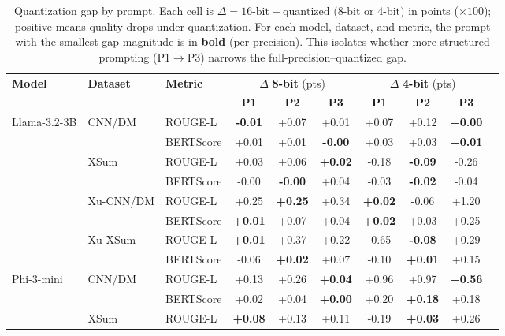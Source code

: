 \begin{table}[!tp]
\centering
\footnotesize
\setlength{\tabcolsep}{5pt}
\caption{Quantization gap by prompt. Each cell is $\Delta = \text{16-bit} - \text{quantized (8-bit or 4-bit)}$ in points ($\times 100$); positive means quality drops under quantization. For each model, dataset, and metric, the prompt with the smallest gap magnitude is in \textbf{bold} (per precision). This isolates whether more structured prompting (P1$\to$P3) narrows the full-precision--quantized gap.}
\label{tab:rq-gap}
\begin{tabular}{lllccccccc}
\toprule
\multirow{2}{*}{\textbf{Model}} & \multirow{2}{*}{\textbf{Dataset}} & \multirow{2}{*}{\textbf{Metric}} & \multicolumn{3}{c}{$\Delta$ \textbf{8-bit} (pts)} & \multicolumn{3}{c}{$\Delta$ \textbf{4-bit} (pts)} \\
\cmidrule(lr){4-6}\cmidrule(lr){7-9}
 & & & \textbf{P1} & \textbf{P2} & \textbf{P3} & \textbf{P1} & \textbf{P2} & \textbf{P3} \\
\midrule
\multirow{8}{*}{Llama-3.2-3B} & \multirow{2}{*}{CNN/DM} & ROUGE-L & \textbf{-0.01} & +0.07 & +0.01 & +0.07 & +0.12 & \textbf{+0.00} \\
 &  & BERTScore & +0.01 & +0.01 & \textbf{-0.00} & +0.03 & +0.03 & \textbf{+0.01} \\
\cmidrule(lr){2-9}
 & \multirow{2}{*}{XSum} & ROUGE-L & +0.03 & +0.06 & \textbf{+0.02} & -0.18 & \textbf{-0.09} & -0.26 \\
 &  & BERTScore & -0.00 & \textbf{-0.00} & +0.04 & -0.03 & \textbf{-0.02} & -0.04 \\
\cmidrule(lr){2-9}
 & \multirow{2}{*}{Xu-CNN/DM} & ROUGE-L & +0.25 & \textbf{+0.25} & +0.34 & \textbf{+0.02} & -0.06 & +1.20 \\
 &  & BERTScore & \textbf{+0.01} & +0.07 & +0.04 & \textbf{+0.02} & +0.03 & +0.25 \\
\cmidrule(lr){2-9}
 & \multirow{2}{*}{Xu-XSum} & ROUGE-L & \textbf{+0.01} & +0.37 & +0.22 & -0.65 & \textbf{-0.08} & +0.29 \\
 &  & BERTScore & -0.06 & \textbf{+0.02} & +0.07 & -0.10 & \textbf{+0.01} & +0.15 \\
\midrule
\multirow{8}{*}{Phi-3-mini} & \multirow{2}{*}{CNN/DM} & ROUGE-L & +0.13 & +0.26 & \textbf{+0.04} & +0.96 & +0.97 & \textbf{+0.56} \\
 &  & BERTScore & +0.02 & +0.04 & \textbf{+0.00} & +0.20 & \textbf{+0.18} & +0.18 \\
\cmidrule(lr){2-9}
 & \multirow{2}{*}{XSum} & ROUGE-L & \textbf{+0.08} & +0.13 & +0.11 & -0.19 & \textbf{+0.03} & +0.26 \\

\end{tabular}
\end{table}
